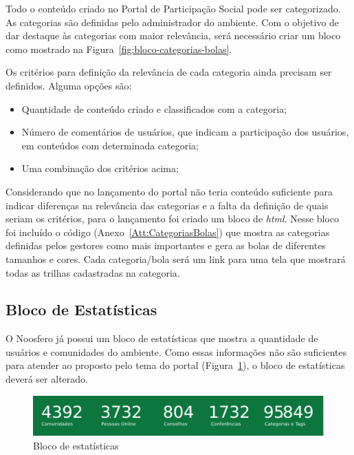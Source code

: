 \documentclass[[a4paper,11pt]{article}
\begin{document}
Todo o conteúdo criado no Portal de Participação Social pode ser
categorizado. As categorias são definidas pelo administrador do
ambiente. Com o objetivo de dar destaque às categorias com maior
relevância, será necessário criar um bloco como mostrado na
Figura~\ref{fig:bloco-categorias-bolas}.

Os critérios para definição da relevância de cada categoria ainda
precisam ser definidos. Alguma opções são:

\begin{itemize}
  \item Quantidade de conteúdo criado e classificados com a categoria;
  \item Número de comentários de usuários, que indicam a participação dos usuários, em
conteúdos com determinada categoria;
  \item Uma combinação dos critérios acima;
\end{itemize}

Considerando que no lançamento do portal não teria conteúdo suficiente
para indicar diferenças na relevância das categorias e a falta da
definição de quais seriam os critérios, para o lançamento foi criado um
bloco de {\it html}. Nesse bloco foi incluído o código
(Anexo~\ref{Att:CategoriasBolas}) que mostra as
categorias definidas pelos gestores como mais importantes e gera as bolas
de diferentes tamanhos e cores. Cada categoria/bola será um link para uma tela que
mostrará todas as trilhas cadastradas na categoria.

\subsection{Bloco de Estatísticas}

O Noosfero já possui um bloco de estatísticas que mostra a quantidade de
usuários e comunidades do ambiente. Como essas informações não são
suficientes para atender ao proposto pelo tema do portal
(Figura~\ref{fig:bloco-estatisticas}), o bloco de
estatísticas deverá ser alterado.

\begin{figure}[h]
\center
\includegraphics[scale=0.4]{bloco-estatisticas.png}
\caption{Bloco de estatísticas}
\label{fig:bloco-estatisticas}
\end{figure}
\end{document}
